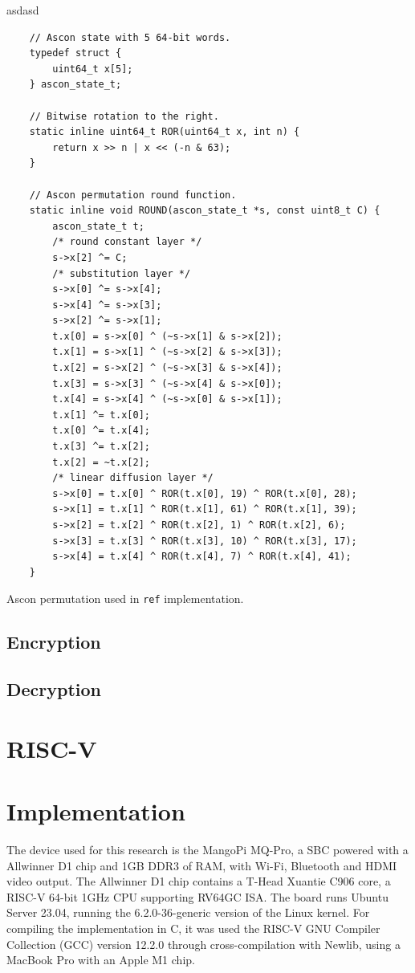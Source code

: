 \documentclass[11pt,twoside]{article}
\begin{document}
asdasd
\begin{listing}[ht!]
  \begin{verbatim}
    // Ascon state with 5 64-bit words.
    typedef struct {
        uint64_t x[5];
    } ascon_state_t;

    // Bitwise rotation to the right.
    static inline uint64_t ROR(uint64_t x, int n) {
        return x >> n | x << (-n & 63);
    }

    // Ascon permutation round function.
    static inline void ROUND(ascon_state_t *s, const uint8_t C) {
        ascon_state_t t;
        /* round constant layer */
        s->x[2] ^= C;
        /* substitution layer */
        s->x[0] ^= s->x[4];
        s->x[4] ^= s->x[3];
        s->x[2] ^= s->x[1];
        t.x[0] = s->x[0] ^ (~s->x[1] & s->x[2]);
        t.x[1] = s->x[1] ^ (~s->x[2] & s->x[3]);
        t.x[2] = s->x[2] ^ (~s->x[3] & s->x[4]);
        t.x[3] = s->x[3] ^ (~s->x[4] & s->x[0]);
        t.x[4] = s->x[4] ^ (~s->x[0] & s->x[1]);
        t.x[1] ^= t.x[0];
        t.x[0] ^= t.x[4];
        t.x[3] ^= t.x[2];
        t.x[2] = ~t.x[2];
        /* linear diffusion layer */
        s->x[0] = t.x[0] ^ ROR(t.x[0], 19) ^ ROR(t.x[0], 28);
        s->x[1] = t.x[1] ^ ROR(t.x[1], 61) ^ ROR(t.x[1], 39);
        s->x[2] = t.x[2] ^ ROR(t.x[2], 1) ^ ROR(t.x[2], 6);
        s->x[3] = t.x[3] ^ ROR(t.x[3], 10) ^ ROR(t.x[3], 17);
        s->x[4] = t.x[4] ^ ROR(t.x[4], 7) ^ ROR(t.x[4], 41);
    }
  \end{verbatim}
  \caption{Ascon permutation used in \texttt{ref} implementation.}
  \label{lst:1}
\end{listing}

\subsection{Encryption}

\subsection{Decryption}

\section{RISC-V}

\section{Implementation}

The device used for this research is the MangoPi MQ-Pro, a SBC powered with a
Allwinner D1 chip and 1GB DDR3 of RAM, with Wi-Fi, Bluetooth and HDMI video
output. The Allwinner D1 chip contains a T-Head Xuantie C906 core, a RISC-V
64-bit 1GHz CPU supporting RV64GC ISA. The board runs Ubuntu Server 23.04,
running the 6.2.0-36-generic version of the Linux kernel. For compiling the implementation in C, it was used the RISC-V GNU Compiler Collection
(GCC) version 12.2.0 \cite{riscvgnutoolchainv2023} through cross-compilation with Newlib, using a MacBook Pro with an Apple M1 chip.
\end{document}
